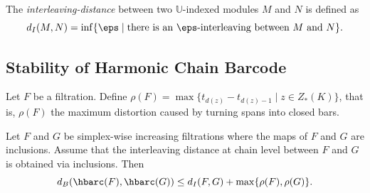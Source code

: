 The \emph{interleaving-distance} between two $\mathbb{U}$-indexed modules $M$ and $N$ is defined as $$ d_I(M,N) = \inf \{\eps\mid \text{there is an $\eps$-interleaving between $M$ and $N$} \}.$$





\subsection{Stability of Harmonic Chain Barcode}\label{subsec:stability}


Let $F$ be a filtration. Define $\rho(F) = \max \{ t_{d(z)} - t_{d(z)-1} \mid z\in Z_*(K)\}$, that is, $\rho(F)$ the maximum distortion caused by turning spans into closed bars.


\begin{theorem}

Let $F$ and $G$ be simplex-wise increasing filtrations where the maps of $F$ and $G$ are inclusions. Assume that the interleaving distance at chain level between $F$ and $G$ is obtained via inclusions. 
Then $$ d_B( {\hbarc(F)}, {\hbarc(G)} ) \leq d_{I}(F,G) +\max \{\rho(F), \rho(G) \}.$$
\end{theorem}


